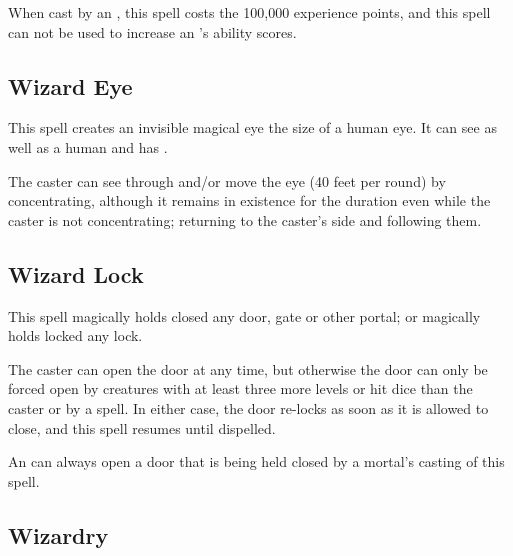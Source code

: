 \begin{multicols*}{2}
When cast by an , this spell costs the  100,000 experience points, and this spell can not be used to increase an ’s ability scores.

\subsection{Wizard Eye}\label{spell:Wizard Eye}

This spell creates an invisible magical eye the size of a human eye. It can see as well as a human and has .

The caster can see through and/or move the eye (40 feet per round) by concentrating, although it remains in existence for the duration even while the caster is not concentrating; returning to the caster’s side and following them.

\subsection{Wizard Lock}\label{spell:Wizard Lock}

This spell magically holds closed any door, gate or other portal; or magically holds locked any lock.

The caster can open the door at any time, but otherwise the door can only be forced open by creatures with at least three more levels or hit dice than the caster or by a  spell. In either case, the door re-locks as soon as it is allowed to close, and this spell resumes until dispelled.

An  can always open a door that is being held closed by a mortal’s casting of this spell.

\subsection{Wizardry}\label{spell:Wizardry}
\end{multicols*}
